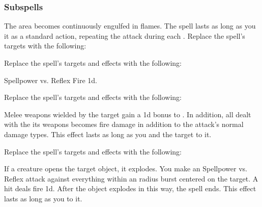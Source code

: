 \subsubsection{Subspells}
The area becomes continuously engulfed in flames.
The spell lasts as long as you  it as a standard action, repeating the attack during each .
Replace the spell's targets with the following:
\begin{spellcontent}
\begin{augmenttargetinginfo}
\end{augmenttargetinginfo}
\end{spellcontent}
Replace the spell's targets and effects with the following:
\begin{spellcontent}
\begin{augmenttargetinginfo}
\end{augmenttargetinginfo}
\begin{augmenteffects}
\begin{spellattack}{Spellpower vs. Reflex}
\spellsuccess Fire  \plus1d.
\end{spellattack}
\end{augmenteffects}
\end{spellcontent}
Replace the spell's targets and effects with the following:
\begin{spellcontent}
\begin{augmenttargetinginfo}
\end{augmenttargetinginfo}
\begin{augmenteffects}
\spelleffect
Melee weapons wielded by the target gain a \plus1d bonus to .
In addition, all  dealt with the its weapons becomes fire damage in addition to the attack's normal damage types.
This effect lasts as long as you and the target  to it.
\end{augmenteffects}
\end{spellcontent}
Replace the spell's targets and effects with the following:
\begin{spellcontent}
\begin{augmenttargetinginfo}
\end{augmenttargetinginfo}
\begin{augmenteffects}
\spelleffect
If a creature opens the target object, it explodes.
You make an Spellpower vs. Reflex attack against everything within an \areamed radius burst centered on the target.
A hit deals fire  \minus1d.
After the object explodes in this way, the spell ends.
This effect lasts as long as you  to it.
\end{augmenteffects}
\end{spellcontent}
